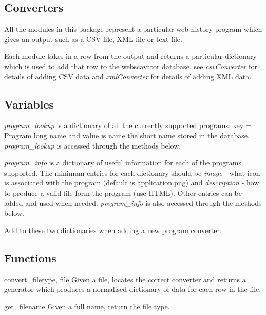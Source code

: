 \documentclass[letterpaper,10pt,english]{manual}
\begin{document}
\subsection{Converters}

All the modules in this package represent a particular web history program which gives an output such 
as a CSV file, XML file or text file.

Each module takes in a row from the output and returns a particular dictionary which is used to add 
that row to the webscavator database. see \hyperlink{--doc-csvConverter}{\emph{csvConverter}} for details of adding CSV data
and \hyperlink{--doc-xmlConverter}{\emph{xmlConverter}} for details of adding XML data.


\subsection{Variables}

\emph{program\_lookup} is a dictionary of all the currently supported programs: key = Program long name 
and value is name the short name stored in the database. \emph{program\_lookup} is accessed through the 
methods below.

\emph{program\_info} is a dictionary of useful information for each of the programs supported.
The minimum entries for each dictionary should be \emph{image} - what icon is associated with
the program (default is application.png) and \emph{description} - how to produce a valid 
file form the program (use HTML). Other entries can be added and used when needed. 
\emph{program\_info} is also accessed through the methods below.

Add to these two dictionaries when adding a new program converter.


\subsection{Functions}

\hypertarget{webscavator.converters.convert_file}{}\begin{funcdesc}{convert\_file}{type, file}
Given a file, locates the correct converter and returns a generator which produces 
a normalised dictionary of data for each row in the file.
\end{funcdesc}

\hypertarget{webscavator.converters.get_file}{}\begin{funcdesc}{get\_file}{name}
Given a full name, return the file type.
\end{funcdesc}
\end{document}
